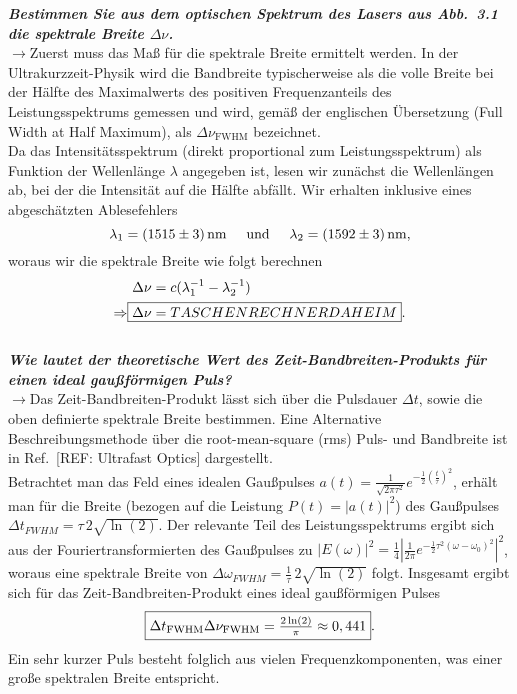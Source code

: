 \textbf{\textit{Bestimmen Sie aus dem optischen Spektrum des Lasers aus Abb.~3.1 die spektrale
Breite $\Delta \nu$.}}\\
$\rightarrow$Zuerst muss das Maß für die spektrale Breite ermittelt werden. 
In der Ultrakurzzeit-Physik wird die Bandbreite typischerweise als die volle Breite bei 
der Hälfte des Maximalwerts des positiven Frequenzanteils des Leistungsspektrums gemessen und wird, 
gemäß der englischen Übersetzung (Full Width at Half Maximum), 
als $\Delta \nu_{\text{FWHM}}$ bezeichnet. \\
Da das Intensitätsspektrum (direkt proportional zum Leistungsspektrum) als Funktion der 
Wellenlänge $\lambda$ angegeben ist, lesen wir zunächst die Wellenlängen ab, bei der die Intensität auf 
die Hälfte abfällt. Wir erhalten inklusive eines abgeschätzten Ablesefehlers 
\begin{equation}
    \lambda_{1} = (1515\pm 3)\,\si{nm} \hspace{0.5cm} \text{und} \hspace{0.5cm} \lambda_{2} = (1592\pm3 )\,\si{nm},
\end{equation}
woraus wir die spektrale Breite wie folgt berechnen
\begin{align}
    \Delta \nu &= c (\lambda_{1}^{-1} - \lambda_{2}^{-1}) \\
    \Rightarrow \Aboxed{\Delta \nu &= TASCHENRECHNER DAHEIM}.
\end{align} \\

\textbf{\textit{Wie lautet der theoretische Wert des Zeit-Bandbreiten-Produkts für
einen ideal gaußförmigen Puls?}}\\
$\rightarrow$Das Zeit-Bandbreiten-Produkt lässt sich über die Pulsdauer $\Delta t$, sowie die 
oben definierte spektrale Breite bestimmen. 
Eine Alternative Beschreibungsmethode über die root-mean-square (rms) Puls- und Bandbreite 
ist in Ref.~[REF: Ultrafast Optics] dargestellt. \\
Betrachtet man das Feld eines idealen Gaußpulses 
$a(t)=\frac{1}{\sqrt{2\pi \tau^{2}}}e^{-\frac{1}{2}(\frac{t}{\tau})^{2}}$, erhält man für die 
Breite (bezogen auf die Leistung $P(t)=|a(t)|^{2}$) des Gaußpulses $\Delta t_{FWHM} = \tau\,2\sqrt{\ln(2)}$. 
Der relevante Teil des Leistungsspektrums ergibt sich aus der Fouriertransformierten des Gaußpulses zu 
$|E(\omega)|^{2} = \frac{1}{4}\left\vert\frac{1}{2\pi}e^{-\frac{1}{2}\tau^{2}(\omega-\omega_{0})^{2}}\right\vert^{2}$, woraus 
eine spektrale Breite von $\Delta \omega_{FWHM} = \frac{1}{\tau}\,2\sqrt{\ln(2)}$ folgt.
Insgesamt ergibt sich für das Zeit-Bandbreiten-Produkt eines ideal gaußförmigen Pulses
\begin{equation}
    \fbox{$\Delta t_{\text{FWHM}}\Delta \nu_{\text{FWHM}} = \frac{2\ln(2)}{\pi} \approx 0,441$}.
\end{equation}
Ein sehr kurzer Puls besteht folglich aus vielen Frequenzkomponenten, was einer große spektralen 
Breite entspricht. \\

